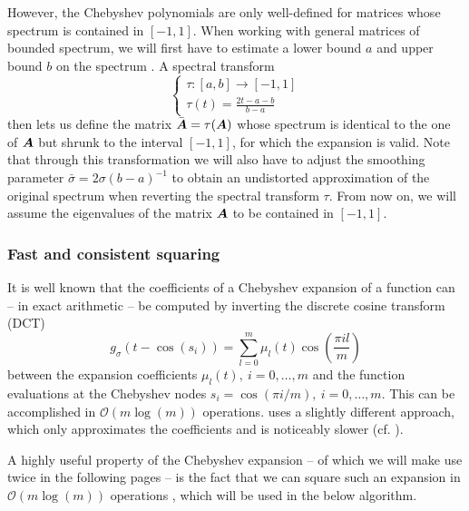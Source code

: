 However, the Chebyshev polynomials are only well-defined for matrices whose spectrum is contained in $[-1, 1]$. When working with general matrices of bounded spectrum, we will first have to estimate a lower bound $a$ and upper bound $b$ on the spectrum \cite{zhou-2011-bounding-spectrum}. A spectral transform
\begin{equation}
    \begin{cases}
        \tau : [a, b] \to [-1, 1]\\
        \tau(t) = \frac{2t - a - b}{b - a}
    \end{cases}
\end{equation}
then lets us define the matrix $\bar{\boldsymbol{A}} = \tau(\boldsymbol{A})$ whose spectrum is identical to the one of $\boldsymbol{A}$ but shrunk to the interval $[-1, 1]$, for which the expansion  is valid. Note that through this transformation we will also have to adjust the smoothing parameter $\bar{\sigma} = 2 \sigma (b - a)^{-1}$ to obtain an undistorted approximation of the original spectrum when reverting the spectral transform $\tau$. From now on, we will assume the eigenvalues of the matrix $\boldsymbol{A}$ to be contained in $[-1, 1]$.

\subsubsection{Fast and consistent squaring}
\label{subsubsec:dct}

It is well known that the coefficients of a Chebyshev expansion of a function can -- in exact arithmetic -- be computed by inverting the discrete cosine transform (DCT)
\begin{equation}
    g_{\sigma}(t - \cos(s_i)) = \sum_{l=0}^{m} \mu_l(t) \cos\left(\frac{\pi i l}{m} \right)
    \label{equ:discrete-cosine-transform}
\end{equation}
between the expansion coefficients $\mu_l(t),~i=0,\dots,m$ and the function evaluations at the Chebyshev nodes $s_i = \cos(\pi i / m),~i=0,\dots,m$. This can be accomplished in $\mathcal{O}(m \log(m))$ operations. \cite[algorithm 1]{lin-2017-randomized-estimation} uses a slightly different approach, which only approximates the coefficients and is noticeably slower (cf. ).

A highly useful property of the Chebyshev expansion -- of which we will make use twice in the following pages -- is the fact that we can square such an expansion in $\mathcal{O}(m \log(m))$ operations \cite{baszenski-1997-fast-polynomial}, which will be used in the below algorithm.

